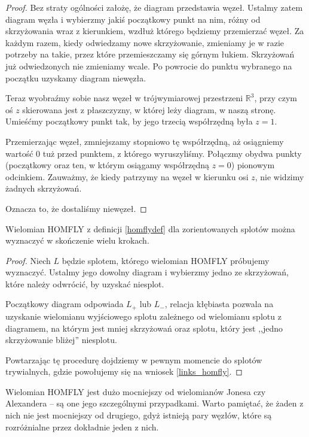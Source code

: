 \begin{proof}
Bez straty ogólności założę, że diagram przedstawia węzeł.
Ustalmy zatem diagram węzła i wybierzmy jakiś początkowy punkt na nim, różny od skrzyżowania wraz z kierunkiem, wzdłuż którego będziemy przemierzać węzeł.
Za każdym razem, kiedy odwiedzamy nowe skrzyżowanie, zmieniamy je w razie potrzeby na takie, przez które przemieszczamy się górnym łukiem.
Skrzyżowań już odwiedzonych nie zmieniamy wcale.
Po powrocie do punktu wybranego na początku uzyskamy diagram niewęzła.

Teraz wyobraźmy sobie nasz węzeł w trójwymiarowej przestrzeni $\mathbb R^3$, przy czym oś $z$ skierowana jest z płaszczyzny, w której leży diagram, w naszą stronę.
Umieśćmy początkowy punkt tak, by jego trzecią współrzędną była $z = 1$.

Przemierzając węzeł, zmniejszamy stopniowo tę współrzędną, aż osiągniemy wartość $0$ tuż przed punktem, z którego wyruszyliśmy.
Połączmy obydwa punkty (początkowy oraz ten, w którym osiągamy współrzędną $z = 0$) pionowym odcinkiem.
Zauważmy, że kiedy patrzymy na węzeł w kierunku osi $z$, nie widzimy żadnych skrzyżowań.

Oznacza to, że dostaliśmy niewęzeł.
\end{proof}

\begin{proposition}
    Wielomian HOMFLY z definicji \ref{homflydef} dla zorientowanych splotów można wyznaczyć w skończenie wielu krokach.
\end{proposition}

\begin{proof}
    Niech $L$ będzie splotem, którego wielomian HOMFLY próbujemy wyznaczyć.
    Ustalmy jego dowolny diagram i wybierzmy jedno ze skrzyżowań, które należy odwrócić, by uzyskać niesplot.

    Początkowy diagram odpowiada $L_+$ lub $L_-$, relacja kłębiasta pozwala na uzyskanie wielomianu wyjściowego splotu zależnego od wielomianu splotu z
    diagramem, na którym jest mniej skrzyżowań oraz splotu, który jest ,,jedno skrzyżowanie bliżej'' niesplotu.

    Powtarzając tę procedurę dojdziemy w pewnym momencie do splotów trywialnych, gdzie powołujemy się na wniosek \ref{links_homfly}.
\end{proof}

Wielomian HOMFLY jest dużo mocniejszy od wielomianów Jonesa czy Alexandera -- są one jego szczególnymi przypadkami.
Warto pamiętać, że żaden z nich nie jest mocniejszy od drugiego, gdyż istnieją pary węzłów, które są rozróżnialne przez dokładnie jeden z nich.

